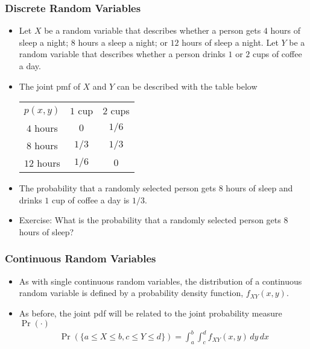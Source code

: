 \begin{frame}
\frametitle{Discrete Random Variables} 
\begin{itemize}
\item Let $X$ be a random variable that describes whether a person gets $4$ hours of sleep a night; $8$ hours a sleep a night; or $12$ hours of sleep a night. Let $Y$ be a random variable that describes whether a person drinks $1$ or $2$ cups of coffee a day. 
\item The joint pmf of $X$ and $Y$ can be described with the table below
\begin{center}
\begin{tabular}{ccc}
\toprule
$p(x,y)$
           & $1$ cup  
                   & $2$ cups\\
 $4$ hours &   $0$ & $1/6$ \\
 $8$ hours & $1/3$ & $1/3$ \\
$12$ hours & $1/6$ & $0$\\
\bottomrule
\end{tabular}
\end{center}
\item The probability that a randomly selected person gets $8$ hours of sleep and drinks $1$ cup of coffee a day is $1/3$.
\item Exercise: What is the probability that a randomly selected person gets $8$ hours of sleep?
\end{itemize}
\end{frame}


\begin{frame}
\frametitle{Continuous Random Variables} 
\begin{itemize}
\item As with single continuous random variables, the distribution of a continuous random variable is defined by a probability density function, $f_{XY}(x,y)$.
\item As before, the joint pdf will be related to the joint probability measure $\Pr(\cdot)$
\begin{align*}
\Pr(\{a\leq X\leq b, c\leq Y\leq d\}) 
    = \int_a^b\int_c^d f_{XY}(x,y)\,dy\,dx
\end{align*} 
\end{itemize}
\end{frame}


